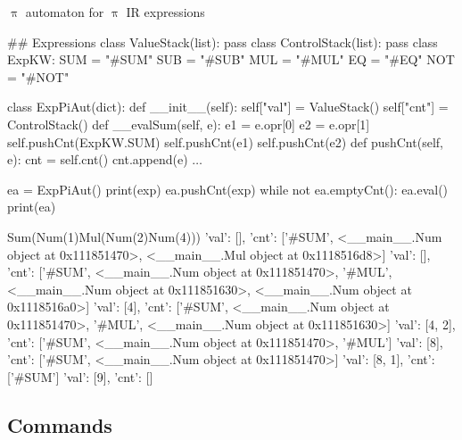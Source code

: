 \documentclass{beamer}
\begin{document}

\begin{frame}{{\color{red}$\uppi$ automaton} for {\color{red}$\uppi$ IR} expressions}

\begin{python}
## Expressions
class ValueStack(list): pass
class ControlStack(list): pass
class ExpKW:
    SUM = "#SUM"
    SUB = "#SUB"
    MUL = "#MUL"
    EQ = "#EQ"
    NOT = "#NOT"
\end{python}

\framebreak    

\begin{python}    
class ExpPiAut(dict):
    def __init__(self):    
        self["val"] = ValueStack()
        self["cnt"] = ControlStack()
    def __evalSum(self, e):
        e1 = e.opr[0]
        e2 = e.opr[1]
        self.pushCnt(ExpKW.SUM)
        self.pushCnt(e1)
        self.pushCnt(e2)
    def pushCnt(self, e):
        cnt = self.cnt()
        cnt.append(e)
$\ldots$
\end{python}

\framebreak

\begin{python}    
ea = ExpPiAut()
print(exp)
ea.pushCnt(exp)
while not ea.emptyCnt():
    ea.eval()
    print(ea)
\end{python}

\framebreak

\begin{adjustbox}{width=2\textwidth}
\begin{python}    
Sum(Num(1)Mul(Num(2)Num(4)))
{'val': [], 'cnt': ['#SUM', <__main__.Num object at 0x111851470>, <__main__.Mul object at 0x1118516d8>]}
{'val': [], 'cnt': ['#SUM', <__main__.Num object at 0x111851470>, '#MUL', <__main__.Num object at 0x111851630>, <__main__.Num object at 0x1118516a0>]}
{'val': [4], 'cnt': ['#SUM', <__main__.Num object at 0x111851470>, '#MUL', <__main__.Num object at 0x111851630>]}
{'val': [4, 2], 'cnt': ['#SUM', <__main__.Num object at 0x111851470>, '#MUL']}
{'val': [8], 'cnt': ['#SUM', <__main__.Num object at 0x111851470>]}
{'val': [8, 1], 'cnt': ['#SUM']}
{'val': [9], 'cnt': []}
\end{python}
\end{adjustbox}

\end{frame}

\subsection{Commands}
\end{document}
